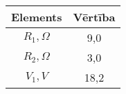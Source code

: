 \begin{center}
\begin{table}[!ht]
\begin{tabular}{| c || c |}
\hline
 \textbf{Elements} & \textbf{Vērtība} \\ [0.5ex] 
 \hline\hline
\hline
$R_{1}, \Omega$ & 9,0 \\ \hline
$R_{2}, \Omega$ & 3,0 \\ \hline
$V_1, V$ & 18,2 \\ \hline
\end{tabular}
\end{table}
\end{center}